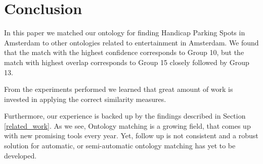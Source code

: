 \documentclass[runningheads,a4paper]{../../StyleFiles/llncs}
\begin{document}
\section{Conclusion}
In this paper we matched our ontology for finding Handicap Parking Spots in Amsterdam to other ontologies related to entertainment in Amsterdam. We found that the match with the highest confidence corresponds to Group 10, but the match with highest overlap corresponds to Group 15 closely followed by Group 13.

From the experiments performed we learned that great amount of work is invested in applying the correct similarity measures.

Furthermore, our experience is backed up by the findings described in Section \ref{related_work}. As we see, Ontology matching is a growing field, that comes up with new promising tools every year. Yet, follow up is not consistent and a robust solution for automatic, or semi-automatic ontology matching has yet to be developed.





\end{document}
